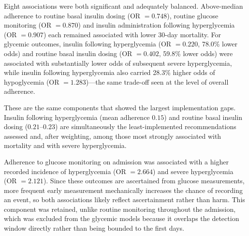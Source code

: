 Eight associations were both significant and adequately balanced.
Above-median adherence to routine basal insulin dosing (OR $=0.748$),
routine glucose monitoring (OR $=0.870$) and insulin administration
following hyperglycemia (OR $=0.907$) each remained associated with lower
30-day mortality. For glycemic outcomes, insulin following hyperglycemia
(OR $=0.220$, 78.0\% lower odds) and routine basal insulin dosing
(OR $=0.402$, 59.8\% lower odds) were associated with substantially lower
odds of subsequent severe hyperglycemia, while insulin following
hyperglycemia also carried 28.3\% higher odds of hypoglycemia
(OR $=1.283$)---the same trade-off seen at the level of overall adherence.

These are the same components that showed the largest implementation gaps.
Insulin following hyperglycemia (mean adherence $0.15$) and routine basal
insulin dosing ($0.21$--$0.23$) are simultaneously the least-implemented
recommendations assessed and, after weighting, among those most strongly
associated with mortality and with severe hyperglycemia.

Adherence to glucose monitoring on admission was associated with a higher
recorded incidence of hyperglycemia (OR $=2.664$) and severe hyperglycemia
(OR $=2.121$). Since these outcomes are ascertained from glucose
measurements, more frequent early measurement mechanically increases the
chance of recording an event, so both associations likely reflect
ascertainment rather than harm. This component was retained, unlike routine
monitoring throughout the admission, which was excluded from the glycemic
models because it overlaps the detection window directly rather than being
bounded to the first days.

